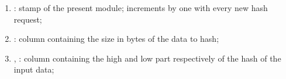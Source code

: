 \begin{enumerate}
	\item \hashInfoStamp{}:
		stamp of the present module;
		increments by one with every new hash request;
	\item \hashInfoSize{}:
		column containing the size in bytes of the data to hash;
	\item \hashInfoValHi{}, \hashInfoValLo{}:
		column containing the high and low part respectively of the hash of the input data; 
\end{enumerate}
